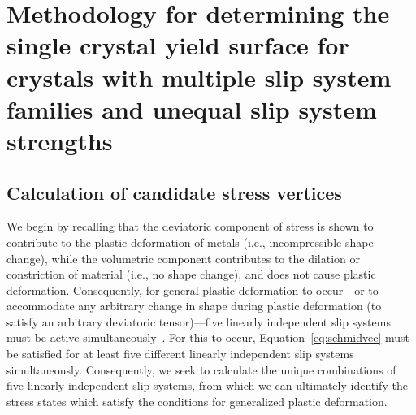 \documentclass[preprint,3p,times,sort&compress,letterpaper,12pt]{elsarticle} %
\begin{document}
\section{Methodology for determining the single crystal yield surface for crystals with multiple slip system families and unequal slip system strengths}
\label{sec:methodology}

\subsection{Calculation of candidate stress vertices}
\label{subsec:cand_stress_verts}

We begin by recalling that the deviatoric component of stress is shown to contribute to the plastic deformation of metals (i.e., incompressible shape change), while the volumetric component contributes to the dilation or constriction of material (i.e., no shape change), and does not cause plastic deformation. Consequently, for general plastic deformation to occur---or to accommodate any arbitrary change in shape during plastic deformation (to satisfy an arbitrary deviatoric tensor)---five linearly independent slip systems must be active simultaneously~\cite{Taylor1938}. For this to occur, Equation~\ref{eq:schmidvec} must be satisfied for at least five different linearly independent slip systems simultaneously. Consequently, we seek to calculate the unique combinations of five linearly independent slip systems, from which we can ultimately identify the stress states which satisfy the conditions for generalized plastic deformation.
\end{document}
